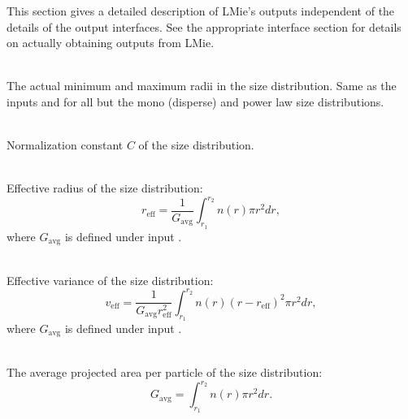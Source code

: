 %
\label{lmie_outputs}

This section gives a detailed description of LMie's outputs independent of the details of the output interfaces.  See the appropriate interface section for details on actually obtaining outputs from LMie.

\begin{description}

\item[\texttt{r21}, \texttt{r22}] \hfill \\
The actual minimum and maximum radii in the size distribution.  Same as the inputs  and  for all but the mono (disperse) and power law size distributions.

\item[\texttt{norm}] \hfill \\
Normalization constant $C$ of the size distribution.

\item[\texttt{reff}] \hfill \\
Effective radius of the size distribution:
\begin{equation}
r_{\mathrm{eff}} = \frac{1}{G_{\mathrm{avg}}} \int^{r_2}_{r_{1}} n(r) \pi r^{2} dr,
\label{eq:lmie_outputs_reff}
\end{equation}
where $G_{\mathrm{avg}}$ is defined under input .

\item[\texttt{veff}] \hfill \\
Effective variance of the size distribution:
\begin{equation}
v_{\mathrm{eff}} = \frac{1}{G_{\mathrm{avg}} r^{2}_{\mathrm{eff}}} \int^{r_2}_{r_{1}} n(r) (r - r_{\mathrm{eff}})^{2} \pi r^{2} dr,
\label{eq:lmie_outputs_veff}
\end{equation}
where $G_{\mathrm{avg}}$ is defined under input .

\item[\texttt{gavg}] \hfill \\
The average projected area per particle of the size distribution:
\begin{equation}
G_{\mathrm{avg}} = \int^{r_2}_{r_{1}} n(r) \pi r^{2} dr.
\label{eq:lmie_outputs_effective_gavg}
\end{equation}


\end{description}
